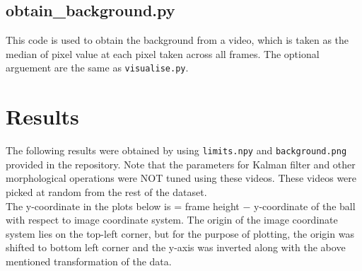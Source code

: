 \documentclass[12pt]{article}
\begin{document}
\subsection*{obtain\_background.py}
This code is used to obtain the background from a video, which is taken as the median of pixel value at each pixel taken across all frames. The optional arguement are the same as \verb|visualise.py|.

\section*{Results}
The following results were obtained by using \verb|limits.npy| and \verb|background.png| provided in the repository. Note that the parameters for Kalman filter and other morphological operations were NOT tuned using these videos. These videos were picked at random from the rest of the dataset.\\
The y-coordinate in the plots below is = frame height $-$ y-coordinate of the ball with respect to image coordinate system. The origin of the image coordinate system lies on the top-left corner, but for the purpose of plotting, the origin was shifted to bottom left corner and the y-axis was inverted along with the above mentioned transformation of the data.
\end{document}
